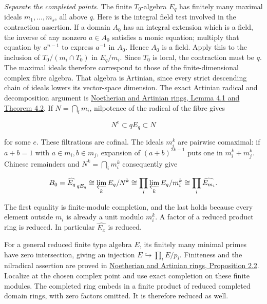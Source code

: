 \documentclass[11pt]{article}
\begin{document}
\emph{Separate the completed points.} The finite \(T_0\)-algebra \(E_q\)
has finitely many maximal ideals \(m_1,\ldots,m_s\), all above \(q\).
Here is the integral field test involved in the contraction assertion.
If a domain \(A_0\) has an integral extension which is a field, the
inverse of any nonzero \(a\in A_0\) satisfies a monic equation; multiply
that equation by \(a^{n-1}\) to express \(a^{-1}\) in \(A_0\). Hence
\(A_0\) is a field. Apply this to the inclusion of \(T_0/(m_i\cap T_0)\)
in \(E_q/m_i\). Since \(T_0\) is local, the contraction must be \(q\).
The maximal ideals therefore correspond to those of the
finite-dimensional complex fibre algebra. That algebra is Artinian,
since every strict descending chain of ideals lowers its vector-space
dimension. The exact Artinian radical and decomposition argument is
\href{https://github.com/KokunoYumeto/open-math-courses/blob/d18141573d82588960ab175843821f0b38ab8802/docs/courses/AG-CA/src/noetherian-and-artinian-rings.md\#4-what-an-artinian-ring-looks-like}{Noetherian
and Artinian rings, Lemma 4.1 and Theorem 4.2}. If \(N=\bigcap_i m_i\),
nilpotence of the radical of the fibre gives

\[
N^e\subset qE_q\subset N
\]

for some \(e\). These filtrations are cofinal. The ideals \(m_i^k\) are
pairwise comaximal: if \(a+b=1\) with \(a\in m_i,b\in m_j\), expansion
of \((a+b)^{2k-1}\) puts one in \(m_i^k+m_j^k\). Chinese remainders and
\(N^k=\bigcap_i m_i^k\) consequently give

\[
B_0=\widehat{E_q}_{\,qE_q}
\cong\varprojlim_k E_q/N^k
\cong\prod_i\varprojlim_k E_q/m_i^k
\cong\prod_i\widehat{E_{m_i}}.
\]

The first equality is finite-module completion, and the last holds
because every element outside \(m_i\) is already a unit modulo
\(m_i^k\). A factor of a reduced product ring is reduced. In particular
\(\widehat{E_x}\) is reduced.

For a general reduced finite type algebra \(E\), its finitely many
minimal primes have zero intersection, giving an injection
\(E\hookrightarrow\prod_i E/p_i\). Finiteness and the nilradical
assertion are proved in
\href{https://github.com/KokunoYumeto/open-math-courses/blob/d18141573d82588960ab175843821f0b38ab8802/docs/courses/AG-CA/src/noetherian-and-artinian-rings.md\#2-polynomial-rings-and-finite-geometric-descriptions}{Noetherian
and Artinian rings, Proposition 2.2}. Localize at the chosen complex
point and use exact completion on these finite modules. The completed
ring embeds in a finite product of reduced completed domain rings, with
zero factors omitted. It is therefore reduced as well.
\end{document}

